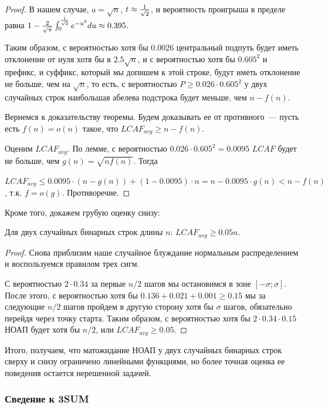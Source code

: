 \begin{proof}
В нашем случае, $a=\sqrt n$, $t \approx {1 \over \sqrt 2}$, и вероятность проигрыша в пределе равна $1 - {2 \over \sqrt \pi} \int_0^{1 \over \sqrt 2} e^{-u^2} du \approx 0.395$.

Таким образом, с вероятностью хотя бы 0.0026 центральный подпуть будет иметь отклонение от нуля хотя бы в $2.5\sqrt n$, и с вероятностью хотя бы $0.605^2$ и префикс, и суффикс, который мы допишем к этой строке, будут иметь отклонение не больше, чем на $\sqrt n$, то есть, с вероятностью $P \ge 0.026 \cdot 0.605^2$ у двух случайных строк наибольшая абелева подстрока будет меньше, чем $n-f(n)$.

Вернемся к доказательству теоремы. Будем доказывать ее от противного~--- пусть есть $f(n)=o(n)$ такое, что $LCAF_{avg} \ge n - f(n)$. 

Оценим $LCAF_{avg}$. По лемме, с вероятностью $0.026 \cdot 0.605^2 = 0.0095$ $LCAF$ будет не больше, чем $g(n)=\sqrt{nf(n)}$. Тогда

$LCAF_{avg} \le 0.0095 \cdot (n-g(n)) + (1-0.0095)\cdot n = n-0.0095\cdot g(n) < n - f(n)$, т.к. $f=o(g)$. Противоречие.

\end{proof}

Кроме того, докажем грубую оценку снизу:
\begin{theorem}
Для двух случайных бинарных строк длины $n$: $LCAF_{avg} \ge 0.05n$.
\end{theorem}
\begin{proof}
Снова приблизим наше случайное блуждание нормальным распределением и воспользуемся правилом трех сигм.

С вероятностью $2 \cdot 0.34$ за первые $n/2$ шагов мы остановимся в зоне $[-\sigma; \sigma]$. После этого, с вероятностью хотя бы $0.136+0.021+0.001 \ge 0.15$ мы за следующие $n/2$ шагов пройдем в другую сторону хотя бы $\sigma$ шагов, обязательно перейдя через точку старта. Таким образом, с вероятностью хотя бы $2 \cdot 0.34 \cdot 0.15$ НОАП будет хотя бы $n/2$, или $LCAF_{avg} \ge 0.05$. %

\end{proof}

Итого, получаем, что матожидание НОАП у двух случайных бинарных строк сверху и снизу ограничено линейными функциями, но более точная оценка ее поведения остается нерешенной задачей.

\subsubsection{Сведение к 3SUM}


